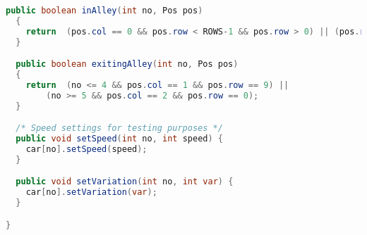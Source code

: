 \begin{lstlisting}[language=java]
  public boolean inAlley(int no, Pos pos)
  {
    return  (pos.col == 0 && pos.row < ROWS-1 && pos.row > 0) || (pos.row == 1 && pos.col < 3);
  }

  public boolean exitingAlley(int no, Pos pos)
  {
    return  (no <= 4 && pos.col == 1 && pos.row == 9) ||
        (no >= 5 && pos.col == 2 && pos.row == 0);
  }

  /* Speed settings for testing purposes */
  public void setSpeed(int no, int speed) { 
    car[no].setSpeed(speed);
  }

  public void setVariation(int no, int var) { 
    car[no].setVariation(var);
  }

}







\end{lstlisting}